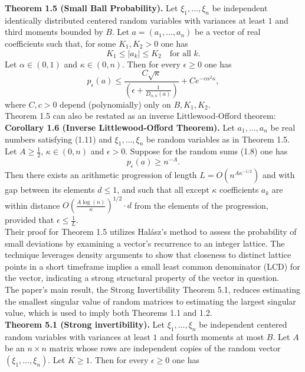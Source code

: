 \textbf{Theorem 1.5 (Small Ball Probability).} Let \(\xi_1, \ldots, \xi_n\) be independent identically distributed centered random variables with variances at least \(1\) and third moments bounded by \(B\). Let \(a = (a_1, \ldots, a_n)\) be a vector of real coefficients such that, for some \(K_1, K_2 > 0\) one has
\[K_1 \leq |a_k| \leq K_2 \quad \text{for all } k.\]
Let \(\alpha \in (0, 1)\) and \(\kappa \in (0, n)\). Then for every \(\epsilon \geq 0\) one has
\[p_{\epsilon}(a) \leq \frac{C\sqrt{\kappa}}{\left(\epsilon + \frac{1}{D_{\alpha,\kappa}(a)}\right)} + C e^{-c\alpha^2\kappa},\]
where \(C, c > 0\) depend (polynomially) only on \(B, K_1, K_2\).\\
Theorem 1.5 can also be restated as an inverse Littlewood-Offord theorem:\\\newline
\textbf{Corollary 1.6 (Inverse Littlewood-Offord Theorem).} Let \(a_1, \ldots, a_n\) be real numbers satisfying (1.11) and \(\xi_1, \ldots, \xi_n\) be random variables as in Theorem 1.5. Let \(A \geq \frac{1}{2}\), \(\kappa \in (0, n)\) and \(\epsilon > 0\). Suppose for the random sums (1.8) one has
\[p_\epsilon(a) \geq n^{-A}.\]
Then there exists an arithmetic progression of length \(L = O(n^{A\kappa^{-1/2}})\) and with gap between its elements \(d \leq 1\), and such that all except \(\kappa\) coefficients \(a_k\) are within distance \(O\left(\frac{A \log(n)}{\kappa}\right)^{1/2} \cdot d\) from the elements of the progression, provided that \(\epsilon \leq \frac{1}{L}\).\\
Their proof for Theorem 1.5 utilizes Halász's method to assess the probability of small deviations by examining a vector's recurrence to an integer lattice. The technique leverages density arguments to show that closeness to distinct lattice points in a short timeframe implies a small least common denominator (LCD) for the vector, indicating a strong structural property of the vector in question.\\
The paper's main result, the Strong Invertibility Theorem 5.1, reduces estimating the smallest singular value of random matrices
to estimating the largest singular value, which is used to imply both Theorems 1.1 and 1.2.\\\newline
\textbf{Theorem 5.1 (Strong invertibility).} Let \(\xi_1, \ldots, \xi_n\) be independent centered random variables with variances at least \(1\) and fourth moments at most \(B\). Let \(A\) be an \(n \times n\) matrix whose rows are independent copies of the random vector \((\xi_1, \ldots, \xi_n)\). Let \(K \geq 1\). Then for every \(\epsilon \geq 0\) one has

